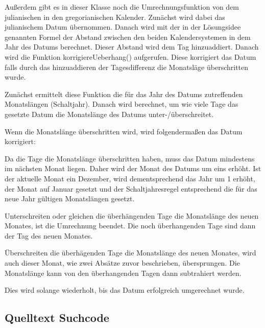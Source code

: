 	Außerdem gibt es in dieser Klasse noch die Umrechnungsfunktion von dem julianischen in den gregorianischen Kalender. 
	Zunächst wird dabei das julianischem Datum übernommen. Danach wird mit der in der Lösungsidee genannten Formel der Abstand zwischen den beiden Kalendersystemen in dem Jahr des Datums berechnet. Dieser Abstand wird dem Tag hinzuaddiert. Danach wird die Funktion korrigiereUeberhang() aufgerufen. Diese korrigiert das Datum falls durch das hinzuaddieren der Tagesdifferenz die Monatsläge überschritten wurde.

	Zunächst ermittelt diese Funktion die für das Jahr des Datums zutreffenden Monatslängen (Schaltjahr). Danach wird berechnet, um wie viele Tage das gesetzte Datum die Monatslänge des Datums unter-/überschreitet.

	Wenn die Monatslänge überschritten wird, wird folgendermaßen das Datum korrigiert:

	Da die Tage die Monatslänge überschritten haben, muss das Datum mindestens im nächsten Monat liegen. Daher wird der Monat des Datums um eins erhöht. Ist der aktuelle Monat ein Dezember, wird dementsprechend das Jahr um 1 erhöht, der Monat auf Januar gesetzt und der Schaltjahresregel entsprechend die für das neue Jahr gültigen Monatslängen gesetzt.

	Unterschreiten oder gleichen die überhängenden Tage die Monatslänge des neuen Monates, ist die Umrechnung beendet. Die noch überhangenden Tage sind dann der Tag des neuen Monates.

	Überschreiten die überhägenden Tage die Monatslänge des neuen Monates, wird auch dieser Monat, wie zwei Absätze zuvor beschrieben, übersprungen. Die Monatslänge kann von den überhangenden Tagen dann subtrahiert werden.

	Dies wird solange wiederholt, bis das Datum erfolgreich umgerechnet wurde.

	
\clearpage
\subsection{Quelltext Suchcode}
	